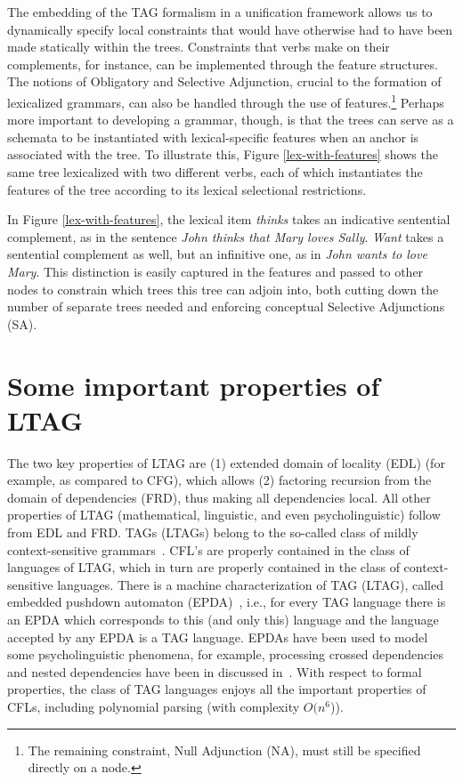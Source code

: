 The embedding of the TAG formalism in a unification framework allows
us to dynamically specify local constraints that would have otherwise
had to have been made statically within the trees.  Constraints that
verbs make on their complements, for instance, can be implemented
through the feature structures.  The notions of Obligatory and
Selective Adjunction, crucial to the formation of lexicalized
grammars, can also be handled through the use of
features.\footnote{The remaining constraint, Null Adjunction (NA),
must still be specified directly on a node.} Perhaps more important to
developing a grammar, though, is that the trees can serve as a
schemata to be instantiated with lexical-specific features when an
anchor is associated with the tree.  To illustrate this, Figure
\ref{lex-with-features} shows the same tree lexicalized with two
different verbs, each of which instantiates the features of the tree
according to its lexical selectional restrictions.

In Figure \ref{lex-with-features}, the lexical item {\it thinks} takes an
indicative sentential complement, as in the sentence {\it John thinks that Mary
loves Sally}.  {\it Want} takes a sentential complement as well, but an
infinitive one, as in {\it John wants to love Mary}.  This distinction is
easily captured in the features and passed to other nodes to constrain which
trees this tree can adjoin into, both cutting down the number of separate trees
needed and enforcing conceptual Selective Adjunctions (SA).

\section{Some important properties of LTAG}

The two key properties of LTAG are (1) extended domain of locality
(EDL) (for example, as compared to CFG), which allows (2) factoring
recursion from the domain of dependencies (FRD), thus making all
dependencies local. All other properties of LTAG (mathematical,
linguistic, and even psycholinguistic) follow from EDL and FRD. TAGs
(LTAGs) belong to the so-called class of mildly context-sensitive
grammars~\cite{joshi85}. CFL's are properly contained in the class of
languages of LTAG, which in turn are properly contained in the class
of context-sensitive languages. There is a machine characterization of
TAG (LTAG), called embedded pushdown automaton (EPDA)~\cite{vijay87},
i.e., for every TAG language there is an EPDA which corresponds to
this (and only this) language and the language accepted by any EPDA is
a TAG language. EPDAs have been used to model some psycholinguistic
phenomena, for example, processing crossed dependencies and nested
dependencies have been in discussed in~\cite{joshi90}. With respect to
formal properties, the class of TAG languages enjoys all the important
properties of CFLs, including polynomial parsing (with complexity
$O(n^{6}$)).

